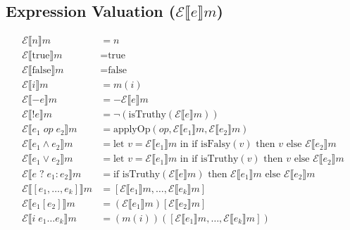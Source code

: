 \documentclass[11pt,a4paper]{article}
\begin{document}
\subsection*{Expression Valuation ($\mathcal{E}\llbracket e \rrbracket m$)}
\begin{align*}
\mathcal{E}\llbracket n \rrbracket m &= n \\
\mathcal{E}\llbracket \text{true} \rrbracket m &= \text{true} \\
\mathcal{E}\llbracket \text{false} \rrbracket m &= \text{false} \\
\mathcal{E}\llbracket i \rrbracket m &= m(i) \\
\mathcal{E}\llbracket -e \rrbracket m &= -\mathcal{E}\llbracket e \rrbracket m \\
\mathcal{E}\llbracket !e \rrbracket m &= \neg (\text{isTruthy}(\mathcal{E}\llbracket e \rrbracket m)) \\
\mathcal{E}\llbracket e_1 \; op \; e_2 \rrbracket m &= \text{applyOp}(op, \mathcal{E}\llbracket e_1 \rrbracket m, \mathcal{E}\llbracket e_2 \rrbracket m) \\
\mathcal{E}\llbracket e_1 \land e_2 \rrbracket m &= \text{let } v = \mathcal{E}\llbracket e_1 \rrbracket m \text{ in if } \text{isFalsy}(v) \text{ then } v \text{ else } \mathcal{E}\llbracket e_2 \rrbracket m \\
\mathcal{E}\llbracket e_1 \lor e_2 \rrbracket m &= \text{let } v = \mathcal{E}\llbracket e_1 \rrbracket m \text{ in if } \text{isTruthy}(v) \text{ then } v \text{ else } \mathcal{E}\llbracket e_2 \rrbracket m \\
\mathcal{E}\llbracket e \; ? \; e_1 : e_2 \rrbracket m &= \text{if } \text{isTruthy}(\mathcal{E}\llbracket e \rrbracket m) \text{ then } \mathcal{E}\llbracket e_1 \rrbracket m \text{ else } \mathcal{E}\llbracket e_2 \rrbracket m \\
\mathcal{E}\llbracket [e_1,\ldots,e_k] \rrbracket m &= [\mathcal{E}\llbracket e_1 \rrbracket m, \ldots, \mathcal{E}\llbracket e_k \rrbracket m] \\
\mathcal{E}\llbracket e_1[e_2] \rrbracket m &= (\mathcal{E}\llbracket e_1 \rrbracket m)[\mathcal{E}\llbracket e_2 \rrbracket m] \\
\mathcal{E}\llbracket i \; e_1 \ldots e_k \rrbracket m &= (m(i))([\mathcal{E}\llbracket e_1 \rrbracket m, \ldots, \mathcal{E}\llbracket e_k \rrbracket m])
\end{align*}
\end{document}
